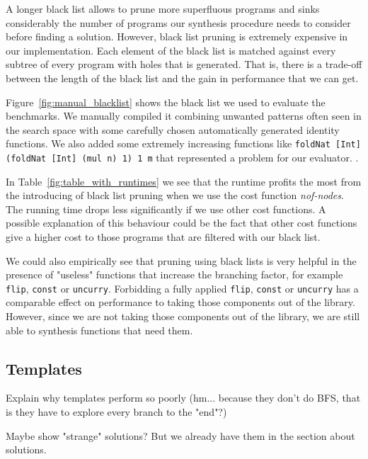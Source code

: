 A longer black list allows to prune more superfluous programs and sinks considerably the number of programs our synthesis procedure needs to consider before finding a solution. However, black list pruning is extremely expensive in our implementation. Each element of the black list is matched against every subtree of every program with holes that is generated. That is, there is a trade-off between the length of the black list and the gain in performance that we can get.

Figure~\ref{fig:manual_blacklist} shows the black list  we used to evaluate the benchmarks. We manually compiled it combining unwanted patterns often seen in the search space with some carefully chosen automatically generated identity functions. We also added some extremely increasing functions like \lstinline!foldNat [Int] (foldNat [Int] (mul n) 1) 1 m! that represented a problem for our evaluator.
.

In Table~\ref{fig:table_with_runtimes} we see that the runtime profits the most from the introducing of black list pruning when we use the cost function \textit{nof-nodes}.
The running time drops less significantly if we use other cost functions. A possible explanation of this behaviour could be the fact that other cost functions give a higher cost to those programs that are filtered with our black list.

We could also empirically see that pruning using black lists is very helpful in the presence of "useless" functions that increase the branching factor, for example \lstinline?flip?, \lstinline?const? or \lstinline?uncurry?. Forbidding a fully applied \lstinline?flip?, \lstinline?const? or \lstinline?uncurry? has a comparable effect on performance to taking those components out of the library. However, since we are not taking those components out of the library, we are still able to synthesis functions that need them.

\subsection{Templates}
Explain why templates perform so poorly (hm... because they don't do BFS, that is they have to explore every branch to the "end"?)

Maybe show "strange" solutions? But we already have them in the section about solutions.

